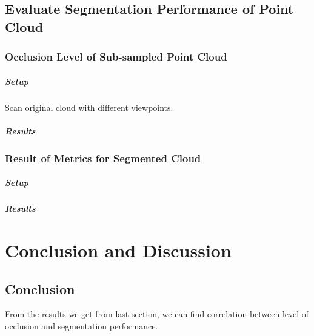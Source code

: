 \documentclass[11pt, a4paper,oneside,chapterprefix=false]{scrbook}
\begin{document}
\section{Evaluate Segmentation Performance of Point Cloud}

\subsection{Occlusion Level of Sub-sampled Point Cloud}

\paragraph{Setup}

Scan original cloud with different viewpoints.

\paragraph{Results}



\subsection{Result of Metrics for Segmented Cloud}



\paragraph{Setup}



\paragraph{Results}




\chapter{Conclusion and Discussion} \label{chp:conclusion}

\section{Conclusion}

From the results we get from last section, we can find correlation between level of occlusion and segmentation performance.
\end{document}
